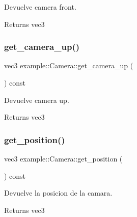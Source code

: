 Devuelve camera front. 

\begin{DoxyReturn}{Returns}
vec3 
\end{DoxyReturn}
\mbox{\label{classexample_1_1_camera_a517cbf4dc63f932664ac24acdf991e2e}} 
\subsubsection{\texorpdfstring{get\_camera\_up()}{get\_camera\_up()}}
{\footnotesize\ttfamily vec3 example\+::\+Camera\+::get\+\_\+camera\+\_\+up (\begin{DoxyParamCaption}{ }\end{DoxyParamCaption}) const\hspace{0.3cm}{\ttfamily [inline]}}



Devuelve camera up. 

\begin{DoxyReturn}{Returns}
vec3 
\end{DoxyReturn}
\mbox{\label{classexample_1_1_camera_ab031bb4b8fc48d8654c95619c1d5b6d4}} 
\subsubsection{\texorpdfstring{get\_position()}{get\_position()}}
{\footnotesize\ttfamily vec3 example\+::\+Camera\+::get\+\_\+position (\begin{DoxyParamCaption}{ }\end{DoxyParamCaption}) const\hspace{0.3cm}{\ttfamily [inline]}}



Devuelve la posicion de la camara. 

\begin{DoxyReturn}{Returns}
vec3 
\end{DoxyReturn}
\mbox{\label{classexample_1_1_camera_a3360041bcaca72ff4ad85e93dd6c0044}} 
